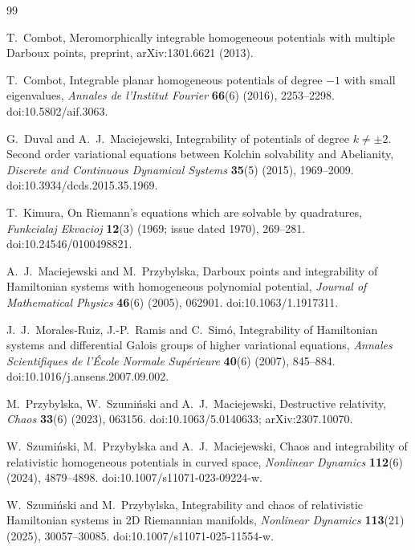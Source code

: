 \documentclass[11pt]{article}
\numberwithin{equation}{section}
\theoremstyle{definition}
\theoremstyle{remark}
\begin{document}
\begin{thebibliography}{99}

T.~Combot, Meromorphically integrable homogeneous potentials with multiple Darboux points, preprint,
arXiv:1301.6621 (2013).

T.~Combot, Integrable planar homogeneous potentials of degree $-1$ with small eigenvalues,
\emph{Annales de l'Institut Fourier} \textbf{66}(6) (2016), 2253--2298. doi:10.5802/aif.3063.

G.~Duval and A.~J.~Maciejewski, Integrability of potentials of degree $k\neq\pm2$. Second order variational
equations between Kolchin solvability and Abelianity, \emph{Discrete and Continuous Dynamical Systems} \textbf{35}(5)
(2015), 1969--2009. doi:10.3934/dcds.2015.35.1969.

T.~Kimura, On Riemann's equations which are solvable by quadratures, \emph{Funkcialaj Ekvacioj} \textbf{12}(3) (1969; issue dated 1970), 269--281. doi:10.24546/0100498821.

A.~J.~Maciejewski and M.~Przybylska, Darboux points and integrability of Hamiltonian systems with homogeneous
polynomial potential, \emph{Journal of Mathematical Physics} \textbf{46}(6) (2005), 062901. doi:10.1063/1.1917311.

J.~J.~Morales-Ruiz, J.-P.~Ramis and C.~Sim\'o, Integrability of Hamiltonian systems and differential Galois groups of
higher variational equations, \emph{Annales Scientifiques de l'\'Ecole Normale Sup\'erieure} \textbf{40}(6) (2007),
845--884. doi:10.1016/j.ansens.2007.09.002.

M.~Przybylska, W.~Szumi\'nski and A.~J.~Maciejewski, Destructive relativity, \emph{Chaos} \textbf{33}(6) (2023),
063156. doi:10.1063/5.0140633; arXiv:2307.10070.

W.~Szumi\'nski, M.~Przybylska and A.~J.~Maciejewski, Chaos and integrability of relativistic homogeneous potentials
in curved space, \emph{Nonlinear Dynamics} \textbf{112}(6) (2024), 4879--4898. doi:10.1007/s11071-023-09224-w.

W.~Szumi\'nski and M.~Przybylska, Integrability and chaos of relativistic Hamiltonian systems in 2D Riemannian
manifolds, \emph{Nonlinear Dynamics} \textbf{113}(21) (2025), 30057--30085. doi:10.1007/s11071-025-11554-w.

\end{thebibliography}
\end{document}
